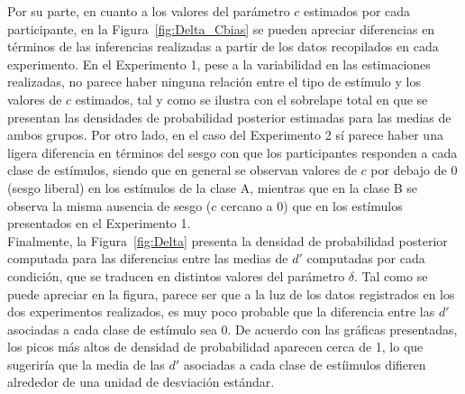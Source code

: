 Por su parte, en cuanto a los valores del parámetro $c$ estimados por cada participante, en la Figura~\ref{fig:Delta_Cbias} se pueden apreciar diferencias en términos de las inferencias realizadas a partir de los datos recopilados en cada experimento. En el Experimento 1, pese a la variabilidad en las estimaciones realizadas, no parece haber ninguna relación entre el tipo de estímulo y los valores de $c$ estimados, tal y como se ilustra con el sobrelape total en que se presentan las densidades de probabilidad posterior estimadas para las medias de ambos grupos. Por otro lado, en el caso del Experimento 2 sí parece haber una ligera diferencia en términos del sesgo con que los participantes responden a cada clase de estímulos, siendo que en general se observan valores de $c$ por debajo de 0 (sesgo liberal) en los estímulos de la clase A, mientras que en la clase B se observa la misma ausencia de sesgo ($c$ cercano a $0$) que en los estímulos presentados en el Experimento 1.\\

Finalmente, la Figura~\ref{fig:Delta} presenta la densidad de probabilidad posterior computada para las diferencias entre las medias de $d'$ computadas por cada condición, que se traducen en distintos valores del parámetro $\delta$. Tal como se puede apreciar en la figura, parece ser que a la luz de los datos registrados en los dos experimentos realizados, es muy poco probable que la diferencia entre las $d'$ asociadas a cada clase de estímulo sea 0. De acuerdo con las gráficas presentadas, los picos más altos de densidad de probabilidad aparecen cerca de 1, lo que sugeriría que la media de las $d'$ asociadas a cada clase de estíimulos difieren alrededor de una unidad de desviación estándar.\\

